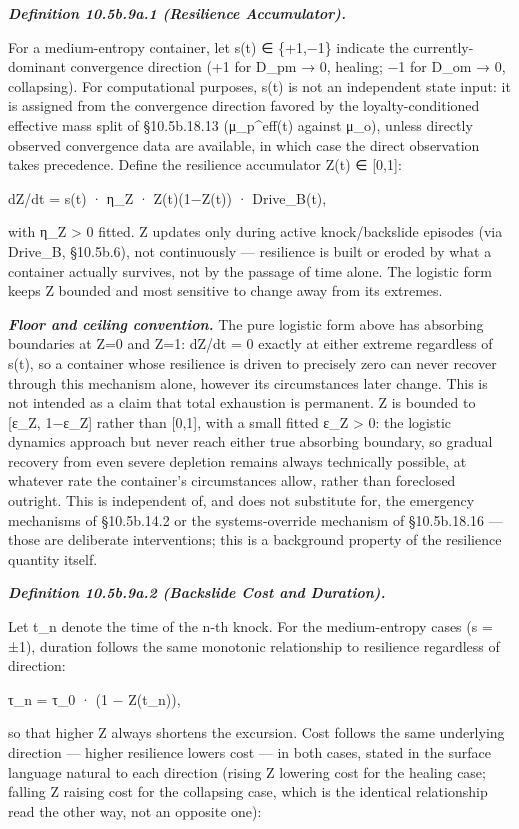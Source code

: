 \documentclass[
]{article}
\begin{document}
\emph{\textbf{Definition 10.5b.9a.1 (Resilience Accumulator).}}

For a medium-entropy container, let s(t) ∈ \{+1,−1\} indicate the
currently-dominant convergence direction (+1 for D\_pm → 0, healing; −1
for D\_om → 0, collapsing). For computational purposes, s(t) is not an
independent state input: it is assigned from the convergence direction
favored by the loyalty-conditioned effective mass split of §10.5b.18.13
(μ\_p\^{}eff(t) against μ\_o), unless directly observed convergence data
are available, in which case the direct observation takes precedence.
Define the resilience accumulator Z(t) ∈ {[}0,1{]}:

dZ/dt = s(t) · η\_Z · Z(t)(1−Z(t)) · Drive\_B(t),

with η\_Z \textgreater{} 0 fitted. Z updates only during active
knock/backslide episodes (via Drive\_B, §10.5b.6), not continuously ---
resilience is built or eroded by what a container actually survives, not
by the passage of time alone. The logistic form keeps Z bounded and most
sensitive to change away from its extremes.

\emph{\textbf{Floor and ceiling convention.}} The pure logistic form
above has absorbing boundaries at Z=0 and Z=1: dZ/dt = 0 exactly at
either extreme regardless of s(t), so a container whose resilience is
driven to precisely zero can never recover through this mechanism alone,
however its circumstances later change. This is not intended as a claim
that total exhaustion is permanent. Z is bounded to {[}ε\_Z, 1−ε\_Z{]}
rather than {[}0,1{]}, with a small fitted ε\_Z \textgreater{} 0: the
logistic dynamics approach but never reach either true absorbing
boundary, so gradual recovery from even severe depletion remains always
technically possible, at whatever rate the container's circumstances
allow, rather than foreclosed outright. This is independent of, and does
not substitute for, the emergency mechanisms of §10.5b.14.2 or the
systems-override mechanism of §10.5b.18.16 --- those are deliberate
interventions; this is a background property of the resilience quantity
itself.

\emph{\textbf{Definition 10.5b.9a.2 (Backslide Cost and Duration).}}

Let t\_n denote the time of the n-th knock. For the medium-entropy cases
(s = ±1), duration follows the same monotonic relationship to resilience
regardless of direction:

τ\_n = τ\_0 · (1 − Z(t\_n)),

so that higher Z always shortens the excursion. Cost follows the same
underlying direction --- higher resilience lowers cost --- in both
cases, stated in the surface language natural to each direction (rising
Z lowering cost for the healing case; falling Z raising cost for the
collapsing case, which is the identical relationship read the other way,
not an opposite one):
\end{document}
